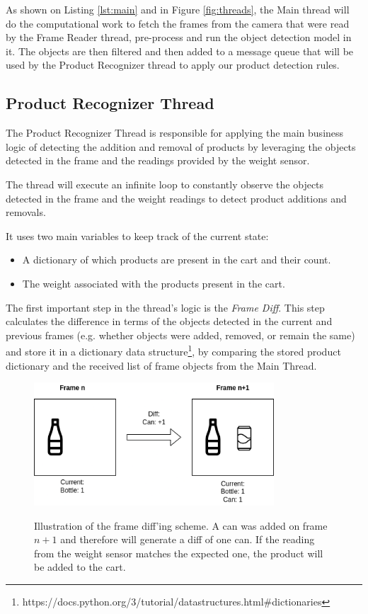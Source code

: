 As shown on Listing \ref{lst:main} and in Figure \ref{fig:threads}, the Main
thread will do the computational work to fetch the frames from the camera that
were read by the Frame Reader thread, pre-process and run the object detection
model in it. The objects are then filtered and then added to a message queue
that will be used by the Product Recognizer thread to apply our product
detection rules.

\subsection{Product Recognizer Thread}

The Product Recognizer Thread is responsible for applying the main business
logic of detecting the addition and removal of products by leveraging the
objects detected in the frame and the readings provided by the weight sensor.

The thread will execute an infinite loop to constantly observe the objects
detected in the frame and the weight readings to detect product additions
and removals.

It uses two main variables to keep track of the current state:
\begin{itemize}
    \item A dictionary of which products are present in the cart and their count.
    \item The weight associated with the products present in the cart.
\end{itemize}

The first important step in the thread's logic is the \textit{Frame Diff}. This step 
calculates the difference in terms of the objects detected in the current 
and previous frames (e.g. whether objects were added, removed, or remain the same) 
and store it in a dictionary data structure\footnote{https://docs.python.org/3/tutorial/datastructures.html\#dictionaries},
by comparing the stored product dictionary and the received list of frame
objects from the Main Thread.

\begin{figure}[H]
	\centering
	\caption[Illustration of the frame diff'ing scheme]{Illustration of the frame diff'ing scheme. A can was added on frame $n+1$ and therefore will generate a diff of one can. If the reading from the weight sensor matches the expected one, the product will be added to the cart.}
    \includegraphics[width=0.8\textwidth]{./images/diagrams/framediff.png}
	\fonte{}
    \label{fig:diff}
\end{figure}

